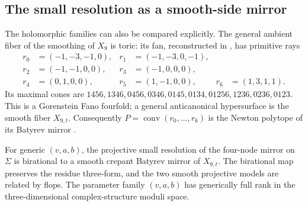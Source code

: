 \subsection{The small resolution as a smooth-side mirror}
\label{subsec:x9-mirror-mutation}

The holomorphic families can also be compared explicitly. The general
ambient fiber of the smoothing of $X_9$ is toric: its fan, reconstructed
in \cite[Section~11]{Wuebben:2026smoothing}, has primitive rays
\begin{equation}
 \begin{aligned}
 r_0&=(-1,-3,-1,0),&r_1&=(-1,-3,0,-1),\\
 r_2&=(-1,-1,0,0),&r_3&=(-1,0,0,0),\\
 r_4&=(0,1,0,0),&r_5&=(1,-1,0,0),&r_6&=(1,3,1,1).
 \end{aligned}
 \label{eq:x9-smooth-mirror-rays}
\end{equation}
Its maximal cones are
$1456,1346,0456,0346,0145,0134,01256,1236,0236,0123$.
This is a Gorenstein Fano fourfold; a general anticanonical
hypersurface is the smooth fiber $X_{9,t}$. Consequently
$P=\operatorname{conv}(r_0,\ldots,r_6)$ is the Newton polytope
of its Batyrev mirror \cite{Batyrev:1994}.

\begin{proposition}\label{prop:x9-mirror-mutation}
For generic $(v,a,b)$, the projective small resolution of the
four-node mirror on $\Sigma$ is birational to a smooth crepant
Batyrev mirror of $X_{9,t}$. The birational map preserves the
residue three-form, and the two smooth projective models are
related by flops. The parameter family $(v,a,b)$ has generically
full rank in the three-dimensional complex-structure moduli space.
\end{proposition}


